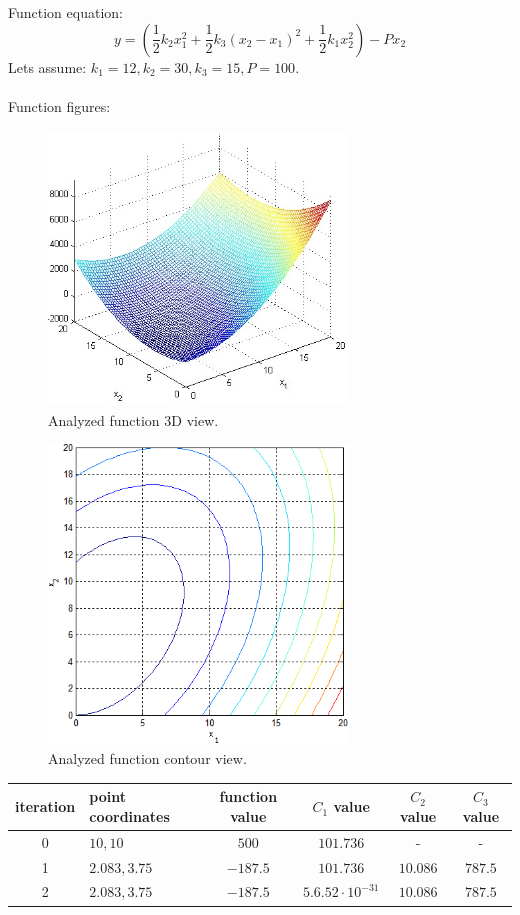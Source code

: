 \documentclass[12pt]{article}
\begin{document}
Function equation:
\begin{equation}
y=(\frac{1}{2}k_2x_1^2+\frac{1}{2}k_3(x_2-x_1)^2+\frac{1}{2}k_1x_2^2)-Px_2
\end{equation}
Lets assume:
$k_1=12, k_2=30, k_3=15, P=100$.
\\\\
Function figures:
\begin{figure}[H]
	\includegraphics[width=8cm]{springs_3D.jpg}
	\caption{Analyzed function 3D view.}
\end{figure}
\begin{figure}[H]
	\includegraphics[width=8cm]{springs_cont.png}
	\caption{Analyzed function contour view.}
\end{figure}

	\begin{table}[H]
		\begin{tabularx}{\textwidth}{c|X|c|c|c|c|}
			iteration & point coordinates & function value & $C_1$ value & $C_2$ value & $C_3$ value\\
			\hline
			0 & $10, 10$ & $500$ & $101.736$ & - & - \\
			\hline
			1 & $2.083, 3.75$ & $-187.5$ & $101.736$ & $10.086$ & $787.5$ \\
			\hline
			2 & $2.083, 3.75$ & $-187.5$ & $5.6.52\cdot10^{-31}$ & $10.086$ & $787.5$ \\
			\hline		
		\end{tabularx}	
	\end{table}
\end{document}
